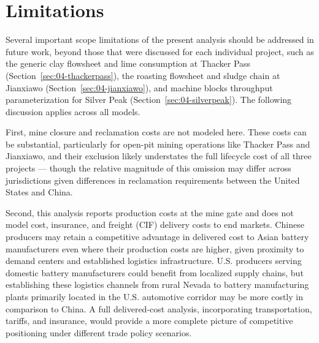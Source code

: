 \documentclass{article}
\renewcommand\_{\textunderscore\allowbreak}
\begin{document}
\section{Limitations}\label{sec:04-limitations}

Several important scope limitations of the present analysis should be addressed in future work, beyond those that were discussed for each individual project, such as the generic clay flowsheet and lime consumption at Thacker Pass (Section~\ref{sec:04-thackerpass}), the roasting flowsheet and sludge chain at Jianxiawo (Section~\ref{sec:04-jianxiawo}), and machine
blocks throughput parameterization for Silver Peak (Section~\ref{sec:04-silverpeak}). The following discussion applies across all models. 

First, mine closure and reclamation costs are not modeled here. These costs can be substantial, particularly for open-pit mining operations like Thacker Pass and Jianxiawo, and their exclusion likely understates the full lifecycle cost of all three projects — though the relative magnitude of this omission may differ across jurisdictions given differences in reclamation requirements between the United States and China.

Second, this analysis reports production costs at the mine gate and does not model cost, insurance, and freight (CIF) delivery costs to end markets. Chinese producers may retain a competitive advantage in delivered cost to Asian battery manufacturers even where their production costs are higher, given proximity to demand centers and established logistics infrastructure. U.S. producers serving domestic battery manufacturers could benefit from localized supply chains, but establishing these logistics channels from rural Nevada to battery manufacturing plants primarily located in the U.S. automotive corridor \cite{chengUSIndustrialPolicy2024} may be more costly in comparison to China. A full delivered-cost analysis, incorporating transportation, tariffs, and insurance, would provide a more complete picture of competitive positioning under different trade policy scenarios.
\end{document}
